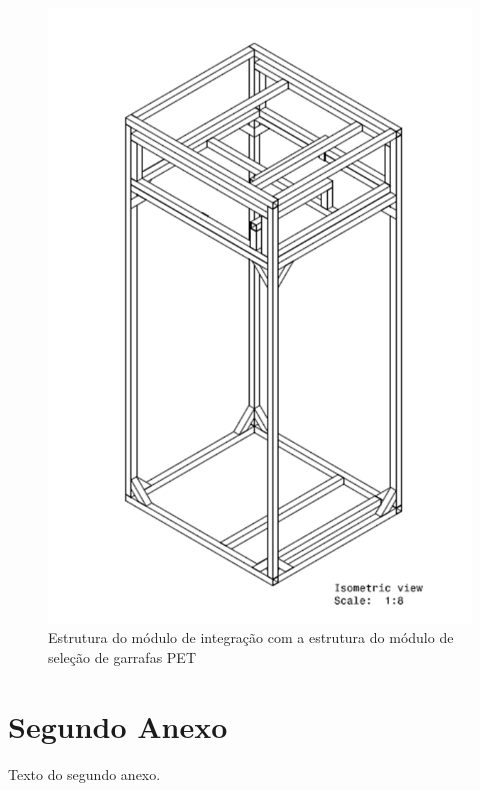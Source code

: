 \begin{anexosenv}
\begin{figure}[!ht]
	\centering
		\includegraphics[scale=0.6]{figuras/estrutura/anexos/20.png}
	\caption{Estrutura do módulo de integração com a estrutura do módulo de seleção de garrafas PET}
\end{figure}

\chapter{Segundo Anexo}

Texto do segundo anexo.

\end{anexosenv}

